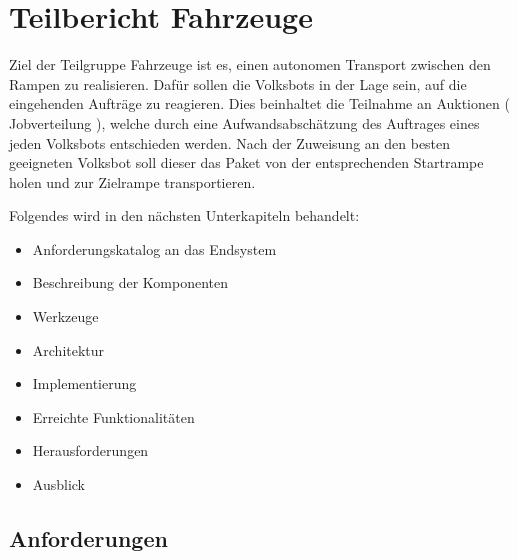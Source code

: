 \section{Teilbericht Fahrzeuge}

Ziel der Teilgruppe Fahrzeuge ist es, einen autonomen Transport zwischen den Rampen zu realisieren. Dafür sollen die Volksbots in der Lage sein, auf die eingehenden Aufträge zu reagieren.
Dies beinhaltet die Teilnahme an Auktionen ( Jobverteilung ), welche durch eine Aufwandsabschätzung des Auftrages eines jeden Volksbots entschieden werden. Nach der Zuweisung an den besten geeigneten Volksbot soll dieser das Paket von der entsprechenden Startrampe holen und zur Zielrampe transportieren.

Folgendes wird in den nächsten Unterkapiteln behandelt:

\begin{itemize}
	\item Anforderungskatalog an das Endsystem
	\item Beschreibung der Komponenten
	\item Werkzeuge
	\item Architektur
	\item Implementierung
	\item Erreichte Funktionalitäten
	\item Herausforderungen
	\item Ausblick
\end{itemize} 

\subsection{Anforderungen}

